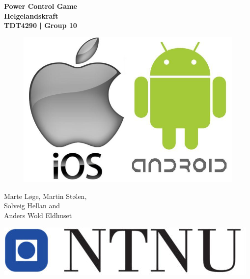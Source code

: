 \begin{titlepage}
\begin{center}

{\Huge \bf Power Control Game} \\[1.0cm]
{\Huge \bf Helgelandskraft} \\[1.0cm]
{\Large \bf TDT4290 | Group 10} \\[1.0cm]

\vspace{1.5cm}

\begin{figure}[!ht]
	\centering
	\includegraphics[scale=0.45]{pictures/android-ios.jpeg}
\end{figure}
\vspace{3cm}

{Marte Løge, Martin Stølen, \\
Solveig Hellan and \\
Anders Wold Eldhuset}

\vspace{1cm}

\includegraphics[scale=0.2]{pictures/ntnu.jpg}


\end{center}
\end{titlepage}
